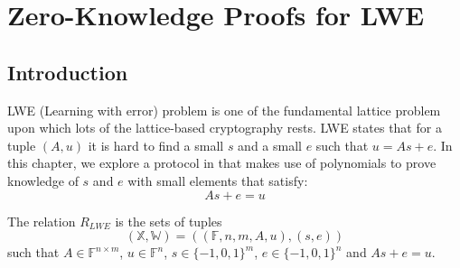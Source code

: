 \chapter{Zero-Knowledge Proofs for LWE}

\section{Introduction}

LWE (Learning with error) problem is one of the fundamental lattice problem upon which lots of the lattice-based cryptography rests. LWE states that for a tuple $(A, u)$ it is hard to find a small $s$ and a small $e$ such that $u = As+e$. In this chapter, we explore a protocol in \cite{lwe} that makes use of polynomials to prove knowledge of $s$ and $e$ with small elements that satisfy:
$$
    As + e = u
$$

\begin{definition}
The relation $R_{LWE}$ is the sets of tuples
$$
    (\mathbb{X}, \mathbb{W}) = ((\mathbb{F}, n, m, A, u), (s, e))
$$ 
such that $A \in \mathbb{F}^{n \times m}$, $u \in \mathbb{F}^{n}$, $s \in \{-1, 0, 1\}^{m}$, $e \in \{-1, 0, 1\}^{n}$ and $As + e = u$.
\end{definition}









